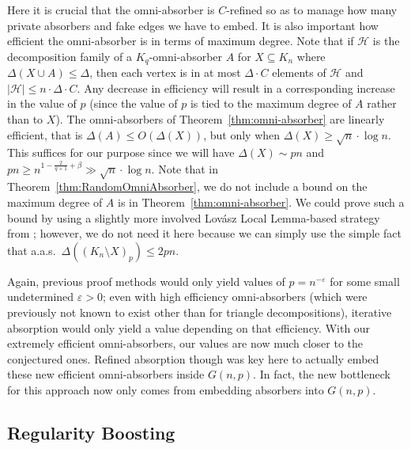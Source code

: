\documentclass[11pt]{article}
\numberwithin{equation}{section}
\newcounter{i}
\theoremstyle{plain}
\theoremstyle{plain} %
\theoremstyle{definition}
\newcommand{\cH}{\mathcal{H}}
\newcommand{\aas}{a.a.s.\ }
\begin{document}
Here it is crucial that the omni-absorber is $C$-refined so as to manage how many private absorbers and fake edges we have to embed. It is also important how efficient the omni-absorber is in terms of maximum degree. 
Note that if $\cH$ is the decomposition family of a $K_q$-omni-absorber $A$ for $X \subseteq K_n$ where $\Delta(X \cup A) \leq \Delta$, then each vertex is in at most $\Delta \cdot C$ elements of $\cH$ and $|\cH| \leq n\cdot \Delta\cdot C$.
Any decrease in efficiency will result in a corresponding increase in the value of $p$ (since the value of $p$ is tied to the maximum degree of $A$ rather than to $X$). The omni-absorbers of Theorem~\ref{thm:omni-absorber} are linearly efficient, that is $\Delta(A)\le O(\Delta(X))$, but only when $\Delta(X) \ge \sqrt{n}\cdot \log n$. This suffices for our purpose since we will have $\Delta(X) \sim pn$ and $pn \ge n^{1-\frac{2}{q+1} + \beta} \gg \sqrt{n}\cdot \log n$.
Note that in Theorem~\ref{thm:RandomOmniAbsorber}, we do not include a bound on the maximum degree of $A$ is in Theorem~\ref{thm:omni-absorber}.  We could prove such a bound by using a slightly more involved Lov\'asz Local Lemma-based strategy from \cite{DKPIV}; however, we do not need it here because we can simply use the simple fact that \aas $\Delta((K_n\setminus X)_p) \leq 2pn$.


Again, previous proof methods would only yield values of $p=n^{-\varepsilon}$ for some small undetermined $\varepsilon > 0$; even with high efficiency omni-absorbers (which were previously not known to exist other than for triangle decompositions), iterative absorption would only yield a value depending on that efficiency. With our extremely efficient omni-absorbers, our values are now much closer to the conjectured ones. Refined absorption though was key here to actually embed these new efficient omni-absorbers inside $G(n,p)$. In fact, the new bottleneck for this approach now only comes from embedding absorbers into $G(n,p)$. 

\subsection{Regularity Boosting}
\end{document}

